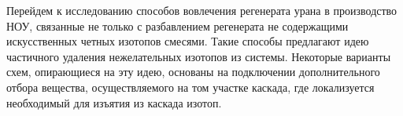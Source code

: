 




Перейдем к исследованию способов вовлечения регенерата урана в производство НОУ, связанные не только с разбавлением регенерата не содержащими искусственных четных изотопов смесями. Такие способы предлагают идею частичного удаления нежелательных изотопов из системы.
Некоторые варианты схем, опирающиеся на эту идею, основаны на подключении дополнительного отбора вещества, осуществляемого на том участке каскада, где локализуется необходимый для изъятия из каскада изотоп.

